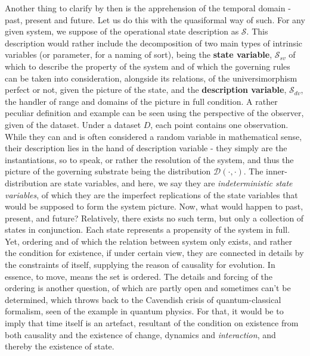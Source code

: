 Another thing to clarify by then is the apprehension of the temporal domain - past, present and future. Let us do this with the quasiformal way of such. For any given system, we suppose of the operational state description as $\mathcal{S}$. This description would rather include the decomposition of two main types of intrinsic variables (or parameter, for a naming of sort), being the \textbf{state variable}, $\mathcal{S}_{sv}$ of which to describe the property of the system and of which the governing rules can be taken into consideration, alongside its relations, of the universimorphism perfect or not, given the picture of the state, and the \textbf{description variable}, $\mathcal{S}_{dv}$, the handler of range and domains of the picture in full condition. A rather peculiar definition and example can be seen using the perspective of the observer, given of the dataset. Under a dataset $D$, each point contains one observation. While they can and is often considered a random variable in mathematical sense, their description lies in the hand of description variable - they simply are the instantiations, so to speak, or rather the resolution of the system, and thus the picture of the governing substrate being the distribution $\mathcal{D}(\cdot,\cdot)$. The inner-distribution are state variables, and here, we say they are \textit{indeterministic state variables}, of which they are the imperfect replications of the state variables that would be supposed to form the system picture. Now, what would happen to past, present, and future? Relatively, there exists no such term, but only a collection of states in conjunction. Each state represents a propensity of the system in full. Yet, ordering and of which the relation between system only exists, and rather the condition for existence, if under certain view, they are connected in details by the constraints of itself, supplying the reason of causality for evolution. In essence, to move, means the set is ordered. The details and forcing of the ordering is another question, of which are partly open and sometimes can't be determined, which throws back to the Cavendish crisis of quantum-classical formalism, seen of the example in quantum physics. For that, it would be to imply that time itself is an artefact, resultant of the condition on existence from both causality and the existence of change, dynamics and \textit{interaction}, and thereby the existence of state. 

